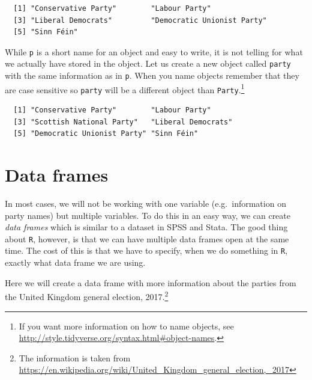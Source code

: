 \documentclass[12pt,oneside]{reedthesis}
\theoremstyle{definition}
\theoremstyle{definition}
\theoremstyle{definition}
\theoremstyle{remark}
\begin{document}
  \begin{verbatim}
  [1] "Conservative Party"        "Labour Party"             
  [3] "Liberal Democrats"         "Democratic Unionist Party"
  [5] "Sinn Féin"                
  \end{verbatim}
  While \texttt{p} is a short name for an object and easy to write, it is
  not telling for what we actually have stored in the object. Let us
  create a new object called \texttt{party} with the same information as
  in \texttt{p}. When you name objects remember that they are case
  sensitive so \texttt{party} will be a different object than
  \texttt{Party}.\footnote{If you want more information on how to name
    objects, see
    \url{http://style.tidyverse.org/syntax.html\#object-names}.}
  \begin{Shaded}
  \begin{Highlighting}[]
  \StringTok{ }
  
  \end{Highlighting}
  \end{Shaded}
  \begin{verbatim}
  [1] "Conservative Party"        "Labour Party"             
  [3] "Scottish National Party"   "Liberal Democrats"        
  [5] "Democratic Unionist Party" "Sinn Féin"                
  \end{verbatim}
  \section{Data frames}\label{data-frames}
  
  In most cases, we will not be working with one variable
  (e.g.~information on party names) but multiple variables. To do this in
  an easy way, we can create \emph{data frames} which is similar to a
  dataset in SPSS and Stata. The good thing about \texttt{R}, however, is
  that we can have multiple data frames open at the same time. The cost of
  this is that we have to specify, when we do something in \texttt{R},
  exactly what data frame we are using.
  
  Here we will create a data frame with more information about the parties
  from the United Kingdom general election, 2017.\footnote{The information
    is taken from
    \url{https://en.wikipedia.org/wiki/United_Kingdom_general_election,_2017}}
  
\end{document}
